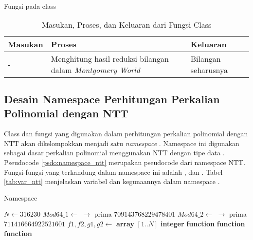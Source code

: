\begin{algorithm}
	\caption{Fungsi  pada class }
	\label{psdo:class_mod64_get}
	\begin{algorithmic}[1]
		\State \Return {}
	\end{algorithmic}
\end{algorithm}

\begin{table}[]	
	\Centering
	\begin{tabular}{|p{3cm}|p{3cm}|p{3cm}|}
	\hline
	Masukan                                                      & Proses                                   & Keluaran \\ \hline
	- & Menghitung hasil reduksi bilangan dalam \textit{Montgomery World} & Bilangan seharusnya \\ \hline
	\end{tabular}
	\caption{Masukan, Proses, dan Keluaran dari Fungsi  Class }
	\label{tab:class_mod64_get}
\end{table}

\newpage

\subsection{Desain Namespace Perhitungan Perkalian Polinomial dengan NTT}
\label{sec:ntt}
Class dan fungsi yang digunakan dalam perhitungan perkalian polinomial dengan NTT akan dikelompokkan menjadi satu \textit{namespace} . Namespace  ini digunakan sebagai dasar perkalian polinomial menggunakan NTT dengan tipe data . Pseudocode \ref{psdo:namespace_ntt} merupakan pseudocode dari namespace NTT. Fungsi-fungsi yang terkandung dalam namespace ini adalah ,  dan . Tabel \ref{tab:var_ntt} menjelaskan variabel dan kegunaannya dalam namespace .

\begin{algorithm}
	\caption{Namespace }
	\label{psdo:namespace_ntt}
	\begin{algorithmic}[1]
		\State $ N \leftarrow 316230 $
		\State $ Mod64\_1 \leftarrow $  $ \rightarrow $ prima $ 709143768229478401 $
		\State $ Mod64\_2 \leftarrow $  $ \rightarrow $ prima $ 711416664922521601 $
		\State $ f1, f2, g1, g2 \leftarrow $ \textbf{array} $ [1..N] $ \textbf{integer}
		\State \textbf{function} 
		\State \textbf{function} 
		\State \textbf{function} 
	\end{algorithmic}
\end{algorithm}


